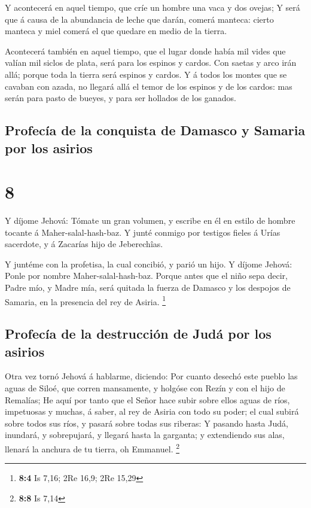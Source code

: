  Y acontecerá en aquel tiempo, que críe un hombre una
vaca y dos ovejas;  Y será que á causa de la abundancia
de leche que darán, comerá manteca: cierto manteca y miel comerá el que
quedare en medio de la tierra.

 Acontecerá también en aquel tiempo, que el lugar donde
había mil vides que valían mil siclos de plata, será para los espinos y
cardos.  Con saetas y arco irán allá; porque toda la
tierra será espinos y cardos.  Y á todos los montes que
se cavaban con azada, no llegará allá el temor de los espinos y de los
cardos: mas serán para pasto de bueyes, y para ser hollados de los
ganados.

\hypertarget{profecuxeda-de-la-conquista-de-damasco-y-samaria-por-los-asirios}{%
\subsection{Profecía de la conquista de Damasco y Samaria por los
asirios}\label{profecuxeda-de-la-conquista-de-damasco-y-samaria-por-los-asirios}}

\hypertarget{section-7}{%
\section{8}\label{section-7}}

 Y díjome Jehová: Tómate un gran volumen, y escribe en él
en estilo de hombre tocante á Maher-salal-hash-baz.  Y
junté conmigo por testigos fieles á Urías sacerdote, y á Zacarías hijo
de Jeberechîas.

 Y juntéme con la profetisa, la cual concibió, y parió un
hijo. Y díjome Jehová: Ponle por nombre Maher-salal-hash-baz.
 Porque antes que el niño sepa decir, Padre mío, y Madre
mía, será quitada la fuerza de Damasco y los despojos de Samaria, en la
presencia del rey de Asiria. \footnote{\textbf{8:4} Is 7,16; 2Re 16,9;
  2Re 15,29}

\hypertarget{profecuxeda-de-la-destrucciuxf3n-de-juduxe1-por-los-asirios}{%
\subsection{Profecía de la destrucción de Judá por los
asirios}\label{profecuxeda-de-la-destrucciuxf3n-de-juduxe1-por-los-asirios}}

 Otra vez tornó Jehová á hablarme, diciendo:
 Por cuanto desechó este pueblo las aguas de Siloé, que
corren mansamente, y holgóse con Rezín y con el hijo de Remalías;
 He aquí por tanto que el Señor hace subir sobre ellos
aguas de ríos, impetuosas y muchas, á saber, al rey de Asiria con todo
su poder; el cual subirá sobre todos sus ríos, y pasará sobre todas sus
riberas:  Y pasando hasta Judá, inundará, y sobrepujará, y
llegará hasta la garganta; y extendiendo sus alas, llenará la anchura de
tu tierra, oh Emmanuel. \footnote{\textbf{8:8} Is 7,14}

